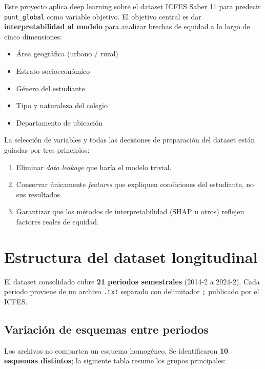 \documentclass[12pt, a4paper]{article}
\begin{document}
Este proyecto aplica deep learning sobre el dataset ICFES Saber 11 para predecir
\texttt{punt\_global} como variable objetivo. El objetivo central es dar
\textbf{interpretabilidad al modelo} para analizar brechas de equidad a lo largo
de cinco dimensiones:

\begin{itemize}
  \item Área geográfica (urbano / rural)
  \item Estrato socioeconómico
  \item Género del estudiante
  \item Tipo y naturaleza del colegio
  \item Departamento de ubicación
\end{itemize}

La selección de variables y todas las decisiones de preparación del dataset están
guiadas por tres principios:

\begin{enumerate}
  \item Eliminar \textit{data leakage} que haría el modelo trivial.
  \item Conservar únicamente \textit{features} que expliquen condiciones del
        estudiante, no sus resultados.
  \item Garantizar que los métodos de interpretabilidad (SHAP u otros) reflejen
        factores reales de equidad.
\end{enumerate}

\section{Estructura del dataset longitudinal}

El dataset consolidado cubre \textbf{21 periodos semestrales} (2014-2 a 2024-2).
Cada periodo proviene de un archivo \texttt{.txt} separado con delimitador
\texttt{;} publicado por el ICFES.

\subsection{Variación de esquemas entre periodos}

Los archivos no comparten un esquema homogéneo. Se identificaron \textbf{10
esquemas distintos}; la siguiente tabla resume los grupos principales:
\end{document}
